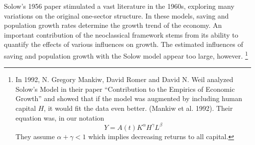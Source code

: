 


Solow's 1956 paper stimulated a vast literature in the 1960s, exploring many variations on the original one-sector structure. %
In these models, saving and population growth rates determine the growth trend of the economy. An important  contribution of the neoclassical framework stems from its ability to quantify the effects of various influences on growth. The estimated influences of saving and population growth with the Solow model appear too large, however.%
\footnote{In 1992, N. Gregory Mankiw, David Romer %
and David N. Weil analyzed Solow’s Model in their paper “Contribution to the Empirics of Economic Growth” and  showed that %
if the model was augmented by including human capital $H$, it would fit the data even better.   (Mankiw et al. 1992). Their equation was, in our notation   \[Y=A(t)K^\alpha H^\gamma L^\beta\label{Eq:Mankiw}\] They assume $\alpha+\gamma<1$ which implies decreasing returns to all capital.}

